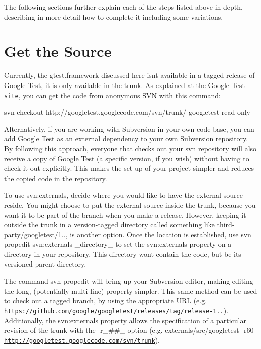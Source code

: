 The following sections further explain each of the steps listed above in depth, describing in more detail how to complete it including some variations.

\section*{Get the Source}

Currently, the gtest.\+framework discussed here isn\textquotesingle{}t available in a tagged release of Google Test, it is only available in the trunk. As explained at the Google Test \href{https://github.com/google/googletest}{\tt site}, you can get the code from anonymous S\+VN with this command\+:


\begin{DoxyCode}
svn checkout http://googletest.googlecode.com/svn/trunk/ googletest-read-only
\end{DoxyCode}


Alternatively, if you are working with Subversion in your own code base, you can add Google Test as an external dependency to your own Subversion repository. By following this approach, everyone that checks out your svn repository will also receive a copy of Google Test (a specific version, if you wish) without having to check it out explicitly. This makes the set up of your project simpler and reduces the copied code in the repository.

To use {\ttfamily svn\+:externals}, decide where you would like to have the external source reside. You might choose to put the external source inside the trunk, because you want it to be part of the branch when you make a release. However, keeping it outside the trunk in a version-\/tagged directory called something like {\ttfamily third-\/party/googletest/1..}, is another option. Once the location is established, use {\ttfamily svn propedit svn\+:externals \+\_\+directory\+\_\+} to set the svn\+:externals property on a directory in your repository. This directory won\textquotesingle{}t contain the code, but be its versioned parent directory.

The command {\ttfamily svn propedit} will bring up your Subversion editor, making editing the long, (potentially multi-\/line) property simpler. This same method can be used to check out a tagged branch, by using the appropriate U\+RL (e.\+g. {\ttfamily \href{https://github.com/google/googletest/releases/tag/release-1.0.1}{\tt https\+://github.\+com/google/googletest/releases/tag/release-\/1..}}). Additionally, the svn\+:externals property allows the specification of a particular revision of the trunk with the {\ttfamily -\/r\+\_\+\#\#\+\_\+} option (e.\+g. {\ttfamily externals/src/googletest -\/r60 \href{http://googletest.googlecode.com/svn/trunk}{\tt http\+://googletest.\+googlecode.\+com/svn/trunk}}).

